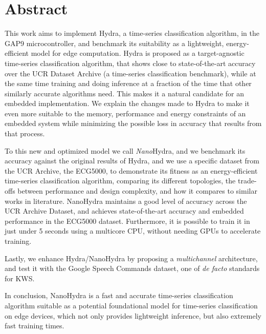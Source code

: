 \chapter*{Abstract}

This work aims to implement Hydra, a time-series classification algorithm, in the GAP9 microcontroller, and benchmark its suitability
as a lightweight, energy-efficient model for edge computation. Hydra is proposed as a target-agnostic time-series classification algorithm, that
shows close to state-of-the-art accuracy over the UCR Dataset Archive (a time-series classification benchmark), while at the same time training and 
doing inference at a fraction of the time that other similarly accurate algorithms need. This makes it a natural candidate for an embedded implementation.
We explain the changes made to Hydra to make it even more suitable to the memory, performance and energy constraints of an embedded system  while minimizing
the possible loss in accuracy that results from that process. 

To this new and optimized model we call \emph{Nano}Hydra, and we benchmark its accuracy against 
the original results of Hydra, and we use a specific dataset from the UCR Archive, the ECG5000, to demonstrate its fitness as an energy-efficient time-series classification
algorithm, comparing its different topologies, the trade-offs between performance and design complexity, and how it compares to similar works in literature.
NanoHydra maintains a good level of accuracy across the UCR Archive Dataset, and achieves state-of-the-art accuracy and embedded performance in the ECG5000 dataset. 
Furthermore, it is possible to train it in just under 5 seconds using a multicore CPU, without needing GPUs to accelerate training. 

Lastly, we enhance Hydra/NanoHydra by proposing a \emph{multichannel} architecture, and test it with the Google Speech Commands dataset, one of \emph{de facto} standards for KWS.

In conclusion, NanoHydra is a fast and accurate time-series classification algorithm suitable as a potential foundational model for time-series classification on edge devices, which not only provides lightweight inference, but also
extremely fast training times.


